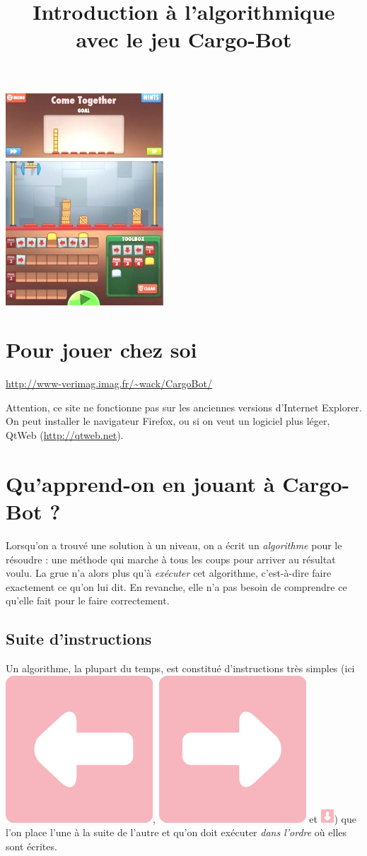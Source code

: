 \documentclass[a4paper,11pt]{article}
\title{Introduction \`a l'algorithmique \\ avec le jeu Cargo-Bot}
\date{}%
\begin{document}
\maketitle
\thispagestyle{empty}
\vspace{-6cm} \hspace*{12.5cm}  \includegraphics[width = 4 cm]{cargo-bot-screen}


\section*{Pour jouer chez soi}

{\Large\url{http://www-verimag.imag.fr/~wack/CargoBot/}}

\medskip

Attention, ce site ne fonctionne pas sur les anciennes versions
d'Internet Explorer. On peut installer le navigateur Firefox, ou si on
veut un logiciel plus léger, QtWeb (\url{http://qtweb.net}).

\section*{Qu'apprend-on en jouant à Cargo-Bot ?}

Lorsqu'on a trouvé une solution à un niveau, on a écrit un
\emph{algorithme} pour le résoudre : une méthode qui marche à tous les
coups pour arriver au résultat voulu. La grue n'a alors plus qu'à
\emph{exécuter} cet algorithme, c'est-à-dire faire exactement ce qu'on
lui dit. En revanche, elle n'a pas besoin de \og comprendre \fg{} ce
qu'elle fait pour le faire correctement.

\subsection*{Suite d'instructions}
\vspace{-2mm}
Un algorithme, la plupart du temps, est constitué d'instructions
très simples (ici \includegraphics[width
=.5cm]{left}, \includegraphics[width =.5cm]{right}
et \includegraphics[width=0.5cm]{down}) que l'on place l'une à la
suite de l'autre et qu'on doit exécuter \emph{dans l'ordre} où elles
sont écrites.
\end{document}
